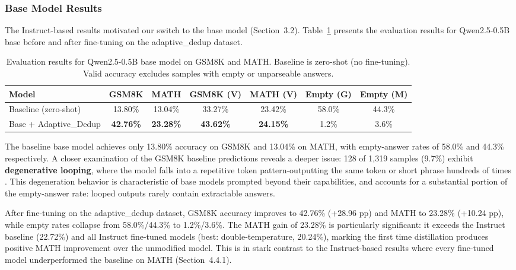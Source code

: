\documentclass{article}
\begin{document}
\subsubsection{Base Model Results}

The Instruct-based results motivated our switch to the base model (Section~3.2). Table~\ref{tab:student_eval_base} presents the evaluation results for Qwen2.5-0.5B base before and after fine-tuning on the adaptive\_dedup dataset.

\begin{table}[H]
\centering
\caption{Evaluation results for Qwen2.5-0.5B base model on GSM8K and MATH. Baseline is zero-shot (no fine-tuning). Valid accuracy excludes samples with empty or unparseable answers.}
\label{tab:student_eval_base}
\begin{tabular}{lcccccc}
\toprule
\textbf{Model} & \textbf{GSM8K} & \textbf{MATH} & \textbf{GSM8K (V)} & \textbf{MATH (V)} & \textbf{Empty (G)} & \textbf{Empty (M)} \\
\midrule
Baseline (zero-shot)          & 13.80\% & 13.04\% & 33.27\% & 23.42\% & 58.0\% & 44.3\% \\
Base + Adaptive\_Dedup        & \textbf{42.76\%} & \textbf{23.28\%} & \textbf{43.62\%} & \textbf{24.15\%} & 1.2\% & 3.6\% \\
\bottomrule
\end{tabular}
\end{table}

The baseline base model achieves only 13.80\% accuracy on GSM8K and 13.04\% on MATH, with empty-answer rates of 58.0\% and 44.3\% respectively. A closer examination of the GSM8K baseline predictions reveals a deeper issue: 128 of 1,319 samples (9.7\%) exhibit \textbf{degenerative looping}, where the model falls into a repetitive token pattern-outputting the same token or short phrase hundreds of times . This degeneration behavior is characteristic of base models prompted beyond their capabilities, and accounts for a substantial portion of the empty-answer rate: looped outputs rarely contain extractable answers.

After fine-tuning on the adaptive\_dedup dataset, GSM8K accuracy improves to 42.76\% (+28.96 pp) and MATH to 23.28\% (+10.24 pp), while empty rates collapse from 58.0\%/44.3\% to 1.2\%/3.6\%. The MATH gain of 23.28\% is particularly significant: it exceeds the Instruct baseline (22.72\%) and all Instruct fine-tuned models (best: double-temperature, 20.24\%), marking the first time distillation produces positive MATH improvement over the unmodified model. This is in stark contrast to the Instruct-based results where every fine-tuned model underperformed the baseline on MATH (Section~4.4.1).
\end{document}

